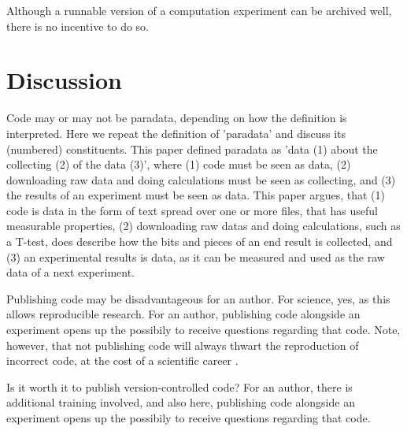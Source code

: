 Although a runnable version of a computation experiment can be archived well, 
there is no incentive to do so.

\section{Discussion}


Code may or may not be paradata, depending on how the definition
is interpreted.
Here we repeat the definition of 'paradata' and discuss 
its (numbered) constituents.
This paper defined paradata as 'data (1) about the collecting (2) of the data (3)',
where (1) code must be seen as data, (2) downloading raw data
and doing calculations must be seen as collecting, and (3) the
results of an experiment must be seen as data.
This paper argues, that (1) code is data in the form of text spread
over one or more files, that has useful measurable properties, 
(2) downloading raw datas and doing calculations, such as a T-test,
does describe how the bits and pieces of an end result is collected,
and (3) an experimental results is data, as it can be measured and
used as the raw data of a next experiment.


Publishing code may be disadvantageous for an author.
For science, yes, as this allows reproducible research.
For an author, publishing code alongside an experiment opens up
the possibily to receive questions regarding that code.
Note, however, that not publishing code will always thwart
the reproduction of incorrect code, at the cost of a scientific
career \cite{baggerly2009deriving}.


Is it worth it to publish version-controlled code?
For an author, 
there is additional training involved, and also here,
publishing code alongside an experiment opens up
the possibily to receive questions regarding that code.

